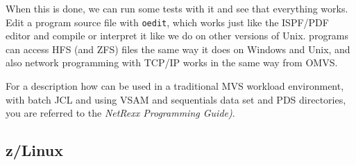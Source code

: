 When this is done, we can run some tests with it and see that
everything works. Edit a program source file with \texttt{oedit},
which works just like the ISPF/PDF editor and compile or interpret it
like we do on other versions of Unix. \nr programs can access HFS (and
ZFS) files the same way it does on Windows and Unix, and also network
programming with TCP/IP works in the same way from OMVS.

For a description how \nr can be used in a traditional MVS
workload environment, with batch JCL and using VSAM and sequentials
data set and PDS directories, you are referred to the \emph{NetRexx
  Programming Guide)}.
\subsection{z/Linux}
